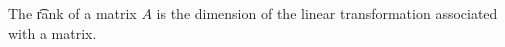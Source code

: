 


The \t{rank} of a matrix $A$ is the dimension of the linear transformation associated with a matrix.
